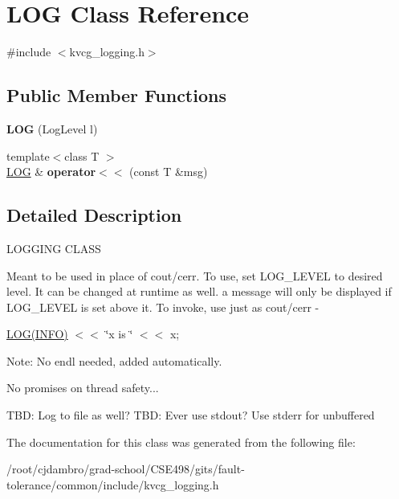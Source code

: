 \hypertarget{classLOG}{\section{L\-O\-G Class Reference}
\label{classLOG}
}


{\ttfamily \#include $<$kvcg\-\_\-logging.\-h$>$}

\subsection*{Public Member Functions}
\begin{DoxyCompactItemize}
\item 
\hypertarget{classLOG_a04ef340e098cf005c9d951695e8915ef}{{\bfseries L\-O\-G} (Log\-Level l)}\label{classLOG_a04ef340e098cf005c9d951695e8915ef}

\item 
\hypertarget{classLOG_ada24e4a188406cd1e46d08c0f71c1958}{{\footnotesize template$<$class T $>$ }\\\hyperlink{classLOG}{L\-O\-G} \& {\bfseries operator$<$$<$} (const T \&msg)}\label{classLOG_ada24e4a188406cd1e46d08c0f71c1958}

\end{DoxyCompactItemize}


\subsection{Detailed Description}
L\-O\-G\-G\-I\-N\-G C\-L\-A\-S\-S

Meant to be used in place of cout/cerr. To use, set L\-O\-G\-\_\-\-L\-E\-V\-E\-L to desired level. It can be changed at runtime as well. a message will only be displayed if L\-O\-G\-\_\-\-L\-E\-V\-E\-L is set above it. To invoke, use just as cout/cerr -\/

\hyperlink{classLOG}{L\-O\-G(\-I\-N\-F\-O)} $<$$<$ \char`\"{}x is \char`\"{} $<$$<$ x;

Note\-: No endl needed, added automatically.

No promises on thread safety...

T\-B\-D\-: Log to file as well? T\-B\-D\-: Ever use stdout? Use stderr for unbuffered 

The documentation for this class was generated from the following file\-:\begin{DoxyCompactItemize}
\item 
/root/cjdambro/grad-\/school/\-C\-S\-E498/gits/fault-\/tolerance/common/include/kvcg\-\_\-logging.\-h\end{DoxyCompactItemize}
